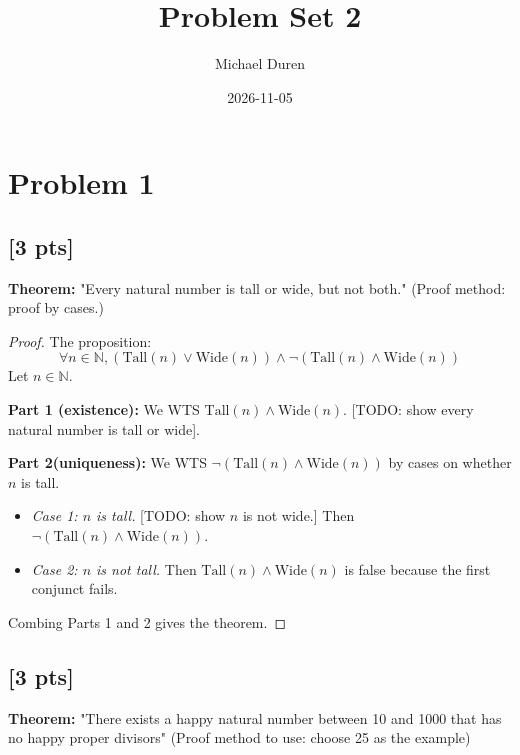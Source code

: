 \documentclass[11pt]{article}
\title{Problem Set 2}
\author{Michael Duren}
\date{2026-11-05}
\newcommand{\N}{\mathbb{N}}
\theoremstyle{definition}
\begin{document}
\maketitle

\section*{Problem 1}

\subsection{[3 pts]} \textbf{Theorem:} "Every natural number is tall or wide, but not both." (Proof method: proof by cases.)

\begin{proof}
	The proposition:
	\[
		\forall n \in \N, (\text{Tall}(n) \vee \text{Wide}(n)) \wedge \neg(\text{Tall}(n) \wedge \text{Wide}(n))
	\]
	Let $n \in \N$.

	\textbf{Part 1 (existence):} We WTS $\text{Tall}(n) \wedge \text{Wide}(n)$.
		[TODO: show every natural number is tall or wide].

	\textbf{Part 2(uniqueness):} We WTS $\neg(\text{Tall}(n) \wedge \text{Wide}(n))$ by cases on whether $n$ is tall.
	\begin{itemize}
		\item \emph{Case 1: $n$ is tall.} [TODO: show $n$ is not wide.] Then $\neg (\text{Tall}(n) \wedge \text{Wide}(n))$.
		\item \emph{Case 2: $n$ is not tall.} Then $\text{Tall}(n) \wedge \text{Wide}(n)$ is false because the first conjunct fails.
	\end{itemize}
	Combing Parts 1 and 2 gives the theorem.
\end{proof}

\vspace{1cm}

\subsection{[3 pts]} \textbf{Theorem:} "There exists a happy natural number between 10 and 1000 that has
no happy proper divisors" (Proof method to use: choose 25 as the example)
\end{document}
